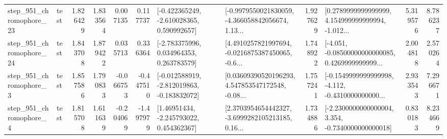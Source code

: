 \begin{tabular}{llrrrrllrlrr}
  step\_951\_chromophore\_23 &      test &      1.826429 &    1.833564 &      0.007135 &  0.117737 &   [-0.422365249, -2.610028365, 0.590992657] &  [-0.9979550021830059, -4.366058842056674, 1.13... &       1.927629 &  [0.2789999999999999, 4.154999999999994, -1.012... &            5.319576 &          8.786237 \\
  step\_951\_chromophore\_24 &      test &      1.843708 &    1.879422 &      0.035713 &  0.336364 &    [-2.783375996, 0.034964353, 0.263783579] &  [4.4910257821997694, -0.0216875387450065, -0.6... &       1.748922 &  [-4.051, -0.08500000000000085, 0.4269999999999... &            2.004818 &          2.570264 \\
   step\_951\_chromophore\_3 &      test &      1.857586 &    1.790833 &     -0.066753 & -0.447510 &  [-0.012588919, -2.812019863, -0.183832072] &  [0.03609390520196293, 4.547853547172548, -0.08... &       1.757241 &  [-0.1549999999999998, -4.112, -0.4310000000000... &            2.933543 &          7.296671 \\
   step\_951\_chromophore\_4 &      test &      1.815708 &    1.611639 &     -0.204069 & -1.497979 &     [1.46951434, -2.245793022, 0.454362367] &  [2.3703954654442327, -3.6999282105213185, 0.16... &       1.734886 &  [-2.2300000000000004, 3.354, -0.7340000000000018] &            0.830183 &          8.234669 \\
\bottomrule
\end{tabular}

